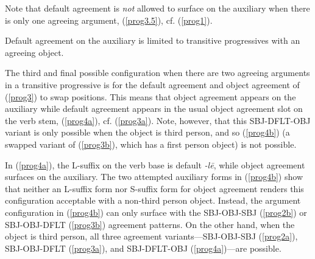 \documentclass[output=paper
,modfonts
,nonflat]{langsci/langscibook}
\begin{document}
\noindent Note that default agreement is \textit{not} allowed to surface on the auxiliary when there is only one agreeing argument, (\ref{prog3.5}), cf. (\ref{prog1}).

\eal \label{prog3.5}
\zl

\noindent Default agreement on the auxiliary is limited to transitive progressives with an agreeing object.

The third and final possible configuration when there are two agreeing arguments in a transitive progressive is for the default agreement and object agreement of (\ref{prog3}) to swap positions. This means that object agreement appears on the auxiliary while default agreement appears in the usual object agreement slot on the verb stem, (\ref{prog4a}), cf. (\ref{prog3a}). Note, however, that this SBJ-DFLT-OBJ variant is only possible when the object is third person, and so (\ref{prog4b}) (a swapped variant of (\ref{prog3b}), which has a first person object) is not possible.

\eal \label{prog4}
\zl

\noindent In (\ref{prog4a}), the L-suffix on the verb base is default \textit{-l\=e}, while object agreement surfaces on the auxiliary. The two attempted auxiliary forms in (\ref{prog4b}) show that neither an L-suffix form nor S-suffix form for object agreement renders this configuration acceptable with a non-third person object. Instead, the argument configuration in (\ref{prog4b}) can only surface with the SBJ-OBJ-SBJ (\ref{prog2b}) or SBJ-OBJ-DFLT (\ref{prog3b}) agreement patterns. On the other hand, when the object is third person, all three agreement variants---SBJ-OBJ-SBJ (\ref{prog2a}), SBJ-OBJ-DFLT (\ref{prog3a}), and SBJ-DFLT-OBJ (\ref{prog4a})---are possible.
\end{document}
